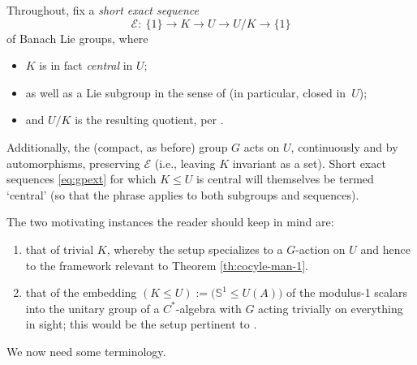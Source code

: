 \documentclass[10pt,a4paper]{amsart}
\numberwithin{equation}{section}
\newcommand\bS{{\mathbb S}}
\newcommand\cE{{\mathcal E}}
\begin{document}
Throughout, fix a {\it short exact sequence}
\begin{equation}\label{eq:gpext}
 \cE \colon \
 \{1\}\to K\xrightarrow{\quad} U\xrightarrow{\quad} U/K\to \{1\}
\end{equation}
of Banach Lie groups, where
\begin{itemize}\itemsep=0pt
\item $K$ is in fact {\it central} in $U$;
\item as well as a Lie subgroup in the sense of \cite[Section~III.1.3, Definition~3]{bourb-lie-13} (in particular, closed in~$U$);
\item and $U/K$ is the resulting quotient, per \cite[Section~III.1.6, Proposition~11\,(ii)]{bourb-lie-13}.
\end{itemize}
Additionally, the (compact, as before) group $G$ acts on $U$, continuously and by automorphisms, preserving $\cE$ (i.e., leaving $K$ invariant as a set). Short exact sequences \eqref{eq:gpext} for which $K\le U$ is central will themselves be termed `central' (so that the phrase applies to both subgroups and sequences).

\begin{Examples}\label{exs:motivk}
 The two motivating instances the reader should keep in mind are:
 \begin{enumerate}[(1)]\itemsep=0pt
 \item that of trivial $K$, whereby the setup specializes to a $G$-action on $U$ and hence to the framework relevant to Theorem \ref{th:cocyle-man-1}.
 \item\label{item:motivk-martin} that of the embedding $(K\le U)
 :=
 \big(\bS^1\le U(A)\big)$ of the modulus-1 scalars into the unitary group of a $C^*$-algebra with $G$ acting trivially on everything in sight; this would be the setup pertinent to \cite{mart-proj}.
 \end{enumerate}
\end{Examples}

We now need some terminology.
\end{document}
